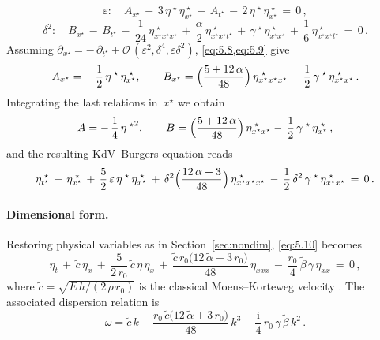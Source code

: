 \documentclass[alpha-refs, 12pt]{wiley-article}
\renewcommand{\O}{\mathcal{O}}
\newcommand{\ui}{\mathrm{i}}
\newcommand{\eps}{\varepsilon}
\begin{document}
\begin{equation}\label{eq:5.8}
  \eps:\quad
  A_{x^{\star}}\,+\,3\,\eta^{\;\star}\,\eta^{\;\star}_{x^{\star}}\,-\,A_{t^{\star}}\,-\,2\,\eta^{\;\star}\,\eta^{\;\star}_{x^{\star}}\,=\,0\,,
\end{equation}
\begin{equation}\label{eq:5.9}
  \delta^{2}:\quad
  B_{x^{\star}}\,-\,B_{t^{\star}}\,-\,\frac{1}{24}\,\eta^{\;\star}_{x^{\star}x^{\star}x^{\star}}\,+\,\frac{\alpha}{2}\,
  \eta^{\;\star}_{x^{\star}x^{\star}t^{\star}}
  \,+\,\gamma^{\;\star}\,\eta^{\;\star}_{x^{\star}x^{\star}}\,+\,\frac{1}{6}\,\eta^{\;\star}_{x^{\star}x^{\star}t^{\star}}\,=\,0\,.
\end{equation}
Assuming $\partial_{x^{\star}} = -\,\partial_{t^{\star}} + \O\,(\varepsilon^{2},\delta^{4},\varepsilon\delta^{2})$, \cref{eq:5.8,eq:5.9} give
\begin{equation*}
  A_{x^{\star}}=-\,\frac{1}{2}\,\eta^{\;\star}\,\eta^{\;\star}_{x^{\star}}, \qquad
  B_{x^{\star}}=\Bigl(\frac{5+12\,\alpha}{48}\Bigr)\,\eta^{\;\star}_{x^{\star}x^{\star}x^{\star}}
  -\,\frac{1}{2}\,\gamma^{\;\star}\,\eta^{\;\star}_{x^{\star}x^{\star}}\,.
\end{equation*}
Integrating the last relations in~$x^{\star}$ we obtain
\begin{equation*}
  A=-\,\frac{1}{4}\,{\eta^{\;\star}}^{2},\qquad
  B=\Bigl(\frac{5+12\,\alpha}{48}\Bigr)\,\eta^{\;\star}_{x^{\star}x^{\star}}
  -\,\frac{1}{2}\,\gamma^{\;\star}\,\eta^{\;\star}_{x^{\star}}\,,
\end{equation*}
and the resulting KdV--Burgers equation reads
\begin{equation}\label{eq:5.10}
  \eta^{\;\star}_{t^{\star}}\,+\,\eta^{\;\star}_{x^{\star}}
  \,+\,\frac{5}{2}\,\varepsilon\,\eta^{\;\star}\,\eta^{\;\star}_{x^{\star}}
  \,+\,\delta^{2}\Bigl(\frac{12\,\alpha+3}{48}\Bigr)\,\eta^{\;\star}_{x^{\star}x^{\star}x^{\star}}
  \,-\,\frac{1}{2}\,\delta^{2}\,\gamma^{\;\star}\,\eta^{\;\star}_{x^{\star}x^{\star}}\,=\,0\,.
\end{equation}

\paragraph{Dimensional form.} Restoring physical variables as in Section~\ref{sec:nondim}, \cref{eq:5.10} becomes
\begin{equation}\label{eq:KdVdim}
  \eta_{t}\,+\,\tilde{c}\,\eta_{x}\,+\,\frac{5}{2\,r_{0}}\,\tilde{c}\,\eta\,\eta_{x}\, + \,\frac{\tilde{c}\,r_{0}\bigl(12\,\tilde{\alpha}+3\,r_{0}\bigr)}{48}\,\eta_{xxx}\, - \,\frac{r_{0}}{4}\,\tilde{\beta}\,\gamma\,\eta_{xx}\,=\,0\,,
\end{equation}
where $\tilde{c}=\sqrt{E\,h/(2\,\rho\,r_{0})}$ is the classical Moens--Korteweg velocity
\cite{Fung1997a}. The associated dispersion relation is
\begin{equation*}
  \omega=\tilde{c}\,k - \frac{r_{0}\,\tilde{c}\bigl(12\,\tilde{\alpha}+3\,r_{0}\bigr)}{48}\,k^{3} - \frac{\ui}{4}\,r_{0}\,\gamma\,\tilde{\beta}\,k^{2}\,.
\end{equation*}
\end{document}
